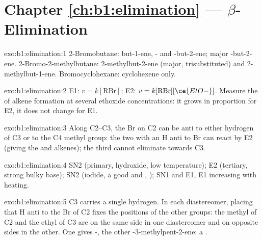 \section*{Chapter \ref{ch:b1:elimination} --- \texorpdfstring{$\beta$}{Beta}-Elimination}

\begin{solution}{exo:b1:elimination:1}
2-Bromobutane: but-1-ene, - and -but-2-ene; major
-but-2-ene. 2-Bromo-2-methylbutane: 2-methylbut-2-ene (major,
trisubstituted) and 2-methylbut-1-ene. Bromocyclohexane: cyclohexene only.
\end{solution}

\begin{solution}{exo:b1:elimination:2}
E1: $v = k[\mathrm{RBr}]$; E2: $v = k[\mathrm{RBr}][\ce{EtO-}]$. Measure the
 of alkene formation at several ethoxide concentrations: it
grows in proportion for E2, it does not change for E1.
\end{solution}

\begin{solution}{exo:b1:elimination:3}
Along C2--C3, the Br on C2 can be anti to either hydrogen of C3 or to
the C4 methyl group: the two  with an H anti to Br can
react by E2 (giving the  and  alkenes); the third cannot
eliminate towards C3.
\end{solution}

\begin{solution}{exo:b1:elimination:4}
SN2 (primary, hydroxide, low temperature); E2 (tertiary, strong bulky
base); SN2 (iodide, a good  and , );
SN1 and E1, E1 increasing with heating.
\end{solution}

\begin{solution}{exo:b1:elimination:5}
C3 carries a single hydrogen. In each diastereomer, placing that H anti to
the Br of C2 fixes the positions of the other groups: the methyl of C2
and the ethyl of C3 are on the same side in one diastereomer and on
opposite sides in the other. One gives -, the other
-3-methylpent-2-ene: a .
\end{solution}

